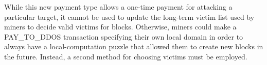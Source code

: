 %

While this new payment type allows a one-time payment for attacking a particular
target, it cannot be used to update the long-term victim list used by miners to
decide valid victims for blocks. Otherwise, miners could make a PAY\_TO\_DDOS
transaction specifying their own local domain in order to always have a
local-computation puzzle that allowed them to create new blocks in the future.
Instead, a second method for choosing victims must be employed.

%

